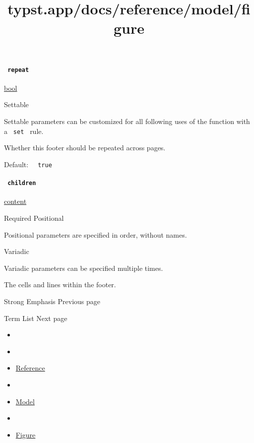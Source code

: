\paragraph{\texorpdfstring{\texttt{\ repeat\ }}{ repeat }}\label{definitions-footer-repeat}

\href{/docs/reference/foundations/bool/}{bool}

{{ Settable }}

\label{definitions-footer-repeat-settable-tooltip}
Settable parameters can be customized for all following uses of the
function with a \texttt{\ set\ } rule.

Whether this footer should be repeated across pages.

Default: \texttt{\ }{\texttt{\ true\ }}\texttt{\ }

\paragraph{\texorpdfstring{\texttt{\ children\ }}{ children }}\label{definitions-footer-children}

\href{/docs/reference/foundations/content/}{content}

{Required} {{ Positional }}

\label{definitions-footer-children-positional-tooltip}
Positional parameters are specified in order, without names.

{{ Variadic }}

\label{definitions-footer-children-variadic-tooltip}
Variadic parameters can be specified multiple times.

The cells and lines within the footer.

\href{/docs/reference/model/strong/}{\pandocbounded{}}

{ Strong Emphasis } { Previous page }

\href{/docs/reference/model/terms/}{\pandocbounded{}}

{ Term List } { Next page }


\title{typst.app/docs/reference/model/figure}

\begin{itemize}
\tightlist
\item
  \href{/docs}{}
\item
  
\item
  \href{/docs/reference/}{Reference}
\item
  
\item
  \href{/docs/reference/model/}{Model}
\item
  
\item
  \href{/docs/reference/model/figure/}{Figure}
\end{itemize}

